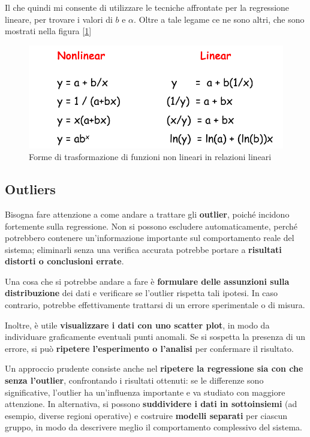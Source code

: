 Il che quindi mi consente di utilizzare le tecniche affrontate per la regressione lineare, per trovare i valori di \(b\) e \(\alpha\). Oltre a tale legame ce ne sono altri, che sono mostrati nella figura [\ref{img:trasformazioni-curvilinee}]

\begin{figure}[h]
\centering
\includegraphics[width=.7\textwidth]{img/chapter-5/relazioni-curvilinee.png}
\caption{Forme di trasformazione di funzioni non lineari in relazioni lineari}\label{img:trasformazioni-curvilinee}
\end{figure}

\subsection{Outliers}
Bisogna fare attenzione a come andare a trattare gli \textbf{outlier}, poiché incidono fortemente sulla regressione. Non si possono escludere automaticamente, perché potrebbero contenere un’informazione importante sul comportamento reale del sistema; eliminarli senza una verifica accurata potrebbe portare a \textbf{risultati distorti o conclusioni errate}.  

Una cosa che si potrebbe andare a fare è \textbf{formulare delle assunzioni sulla distribuzione} dei dati e verificare se l’outlier rispetta tali ipotesi. In caso contrario, potrebbe effettivamente trattarsi di un errore sperimentale o di misura.  

Inoltre, è utile \textbf{visualizzare i dati con uno scatter plot}, in modo da individuare graficamente eventuali punti anomali. Se si sospetta la presenza di un errore, si può \textbf{ripetere l’esperimento o l’analisi} per confermare il risultato.  

Un approccio prudente consiste anche nel \textbf{ripetere la regressione sia con che senza l’outlier}, confrontando i risultati ottenuti: se le differenze sono significative, l’outlier ha un’influenza importante e va studiato con maggiore attenzione. In alternativa, si possono \textbf{suddividere i dati in sottoinsiemi} (ad esempio, diverse regioni operative) e costruire \textbf{modelli separati} per ciascun gruppo, in modo da descrivere meglio il comportamento complessivo del sistema.

